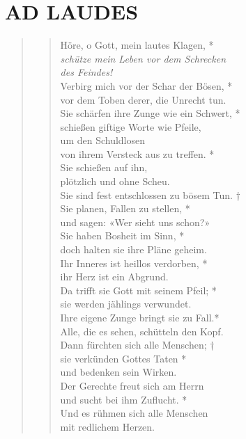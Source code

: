 \section[LAUDES]{AD LAUDES}

\def\greinitialformat#1{{\fontsize{40}{40}\selectfont #1}}
\gresetfirstlineaboveinitial{\small \textcolor{red}{ Ps 64}}{}
\setaboveinitialseparation{0.72mm}


\vspace{0.6cm}


\begin{quote}
\begin{verse}
Höre, o Gott, mein lautes Klagen, *\\
\textit{schütze mein Leben vor dem Schrecken\\
des Feindes!}\\ 
\vin Verbirg mich vor der Schar der Bösen, *\\ 
\vin vor dem Toben derer, die Unrecht tun.\\
Sie schärfen ihre Zunge wie ein Schwert, *\\
schießen giftige Worte wie Pfeile, \\ 
\vin um den Schuldlosen\\ 
\vin von ihrem Versteck aus zu treffen. *\\ 
\vin Sie schießen auf ihn,\\ 
\vin plötzlich und ohne Scheu.\\ 
Sie sind fest entschlossen zu bösem Tun. †\\
Sie planen, Fallen zu stellen, *\\ 
und sagen: «Wer sieht uns schon?»\\ 
\vin Sie haben Bosheit im Sinn, *\\ 
\vin doch halten sie ihre Pläne geheim.\\ 
Ihr Inneres ist heillos verdorben, *\\ 
ihr Herz ist ein Abgrund.\\ 
\vin Da trifft sie Gott mit seinem Pfeil; *\\ 
\vin sie werden jählings verwundet.\\
Ihre eigene Zunge bringt sie zu Fall.*\\
Alle, die es sehen, schütteln den Kopf.\\ 
\vin Dann fürchten sich alle Menschen; †\\ 
\vin sie verkünden Gottes Taten *\\ 
\vin und bedenken sein Wirken.\\
Der Gerechte freut sich am Herrn\\
und sucht bei ihm Zuflucht. *\\
Und es rühmen sich alle Menschen\\
mit redlichem Herzen.\\
\end{verse}
\end{quote}


